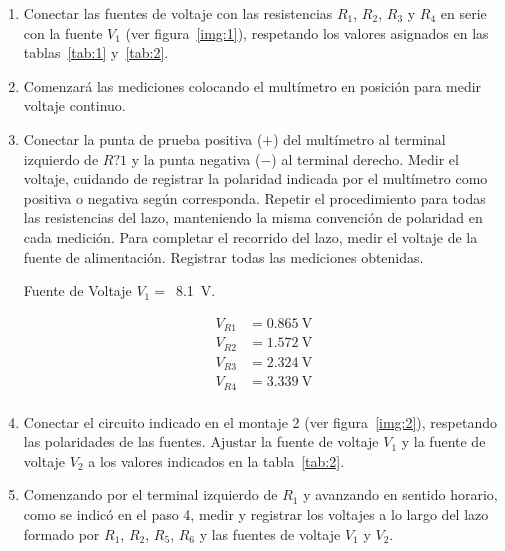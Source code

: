 \documentclass{article}
\begin{document}
    \begin{enumerate}
        \item Conectar las fuentes de voltaje con las resistencias $R_1$, $R_2$, $R_3$ y $R_4$ en serie con la fuente $V_1$ (ver figura~\ref{img:1}), respetando los valores asignados en las tablas~\ref{tab:1} y~\ref{tab:2}.
        
        \label{img:1}

        \item Comenzará las mediciones colocando el multímetro en posición para medir voltaje continuo.
        
        \item Conectar la punta de prueba positiva ($+$) del multímetro al terminal izquierdo de $R?1$ y la punta negativa ($-$) al terminal derecho. Medir el voltaje, cuidando de registrar la polaridad indicada por el multímetro como positiva o negativa según corresponda. Repetir el procedimiento para todas las resistencias del lazo, manteniendo la misma convención de polaridad en cada medición. Para completar el recorrido del lazo, medir el voltaje de la fuente de alimentación. Registrar todas las mediciones obtenidas.
        
        Fuente de Voltaje $V_1 =$~\SI{8.1}{\volt}. 

        \begin{align*}
            V_{R1} &= 0.865~\unit{\volt}\\
            V_{R2} &= 1.572~\unit{\volt}\\
            V_{R3} &= 2.324~\unit{\volt}\\
            V_{R4} &= 3.339~\unit{\volt}\\
        \end{align*}

        \item Conectar el circuito indicado en el montaje 2 (ver figura~\ref{img:2}), respetando las polaridades de las fuentes. Ajustar la fuente de voltaje $V_1$ y la fuente de voltaje $V_2$ a los valores indicados en la tabla~\ref{tab:2}.
        
        \label{img:2}

        \item Comenzando por el terminal izquierdo de $R_1$ y avanzando en sentido horario, como se indicó en el paso 4, medir y registrar los voltajes a lo largo del lazo formado por $R_1$, $R_2$, $R_5$, $R_6$ y las fuentes de voltaje $V_1$ y $V_2$.
        

\end{enumerate}
\end{document}

